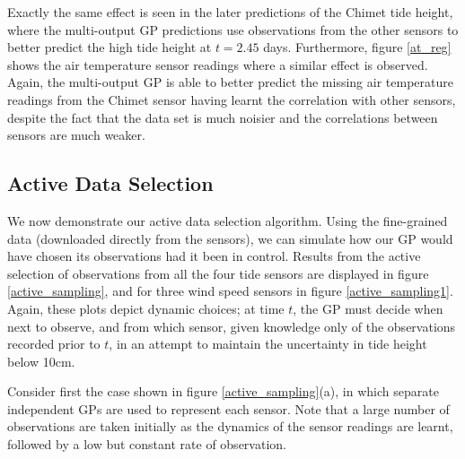 \documentclass{acmtrans2m}
\begin{document}
Exactly the same effect is seen in the later predictions of the Chimet tide height, where the multi-output GP predictions use observations from the other sensors to better predict the high tide height at $t=2.45$ days. Furthermore, figure \ref{at_reg} shows the air temperature sensor readings where a similar effect is observed. Again, the multi-output GP is able to better predict the missing air temperature readings from the Chimet sensor having learnt the correlation with other sensors, despite the fact that the data set is much noisier and the correlations between sensors are much weaker.

\subsection{Active Data Selection}

\noindent We now demonstrate our active data selection algorithm. Using the fine-grained data (downloaded directly from the sensors), we can simulate how our GP would have chosen its observations had it been in control. Results from the active selection of observations from all the four tide sensors are displayed in figure \ref{active_sampling}, and for three wind speed sensors in figure \ref{active_sampling1}. Again, these plots depict dynamic choices; at time $t$, the GP must decide when next to observe, and from which sensor, given knowledge only of the observations recorded prior to $t$, in an attempt to maintain the uncertainty in tide height below 10cm.

Consider first the case shown in figure \ref{active_sampling}(a), in which separate independent GPs are used to represent each sensor. Note that a large number of observations are taken initially as the dynamics of the sensor readings are learnt, followed by a low but constant rate of observation.
\end{document}
